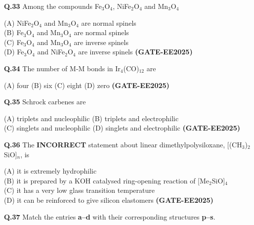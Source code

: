 \documentclass[12pt]{article}
\begin{document}
\begin{enumerate}
\vspace{0.5cm}

\textbf{Q.33} Among the compounds Fe$_3$O$_4$, NiFe$_2$O$_4$ and Mn$_3$O$_4$

(A) NiFe$_2$O$_4$ and Mn$_3$O$_4$ are normal spinels\\
(B) Fe$_3$O$_4$ and Mn$_3$O$_4$ are normal spinels\\
(C) Fe$_3$O$_4$ and Mn$_3$O$_4$ are inverse spinels\\
(D) Fe$_3$O$_4$ and NiFe$_2$O$_4$ are inverse spinels   \textbf{(GATE-EE2025)}


\vspace{0.5cm}

\textbf{Q.34} The number of M-M bonds in Ir$_4$(CO)$_{12}$ are

(A) four \hspace{1cm}
(B) six \hspace{1cm}
(C) eight \hspace{1cm}
(D) zero   \textbf{(GATE-EE2025)}


\vspace{0.5cm}

\textbf{Q.35} Schrock carbenes are

(A) triplets and nucleophilic \hspace{1cm}
(B) triplets and electrophilic\\
(C) singlets and nucleophilic \hspace{1cm}
(D) singlets and electrophilic   \textbf{(GATE-EE2025)}


\vspace{0.5cm}

\textbf{Q.36} The \textbf{INCORRECT} statement about linear dimethylpolysiloxane, [(CH$_3$)$_2$SiO]$_n$, is

(A) it is extremely hydrophilic\\
(B) it is prepared by a KOH catalysed ring-opening reaction of [Me$_2$SiO]$_4$\\
(C) it has a very low glass transition temperature\\
(D) it can be reinforced to give silicon elastomers   \textbf{(GATE-EE2025)}


\vspace{0.5cm}

\textbf{Q.37} Match the entries \textbf{a–d} with their corresponding structures \textbf{p–s}.\\[1em]


\end{enumerate}
\end{document}
